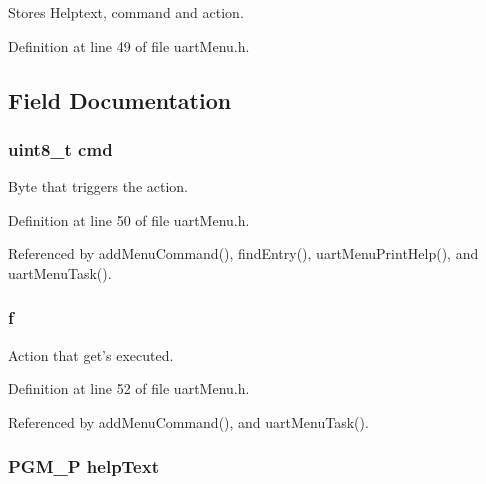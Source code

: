 Stores Helptext, command and action. 

Definition at line 49 of file uart\-Menu.\-h.



\subsection{Field Documentation}
\hypertarget{struct_menu_entry_a4d43e8212bdc9dbee866506f04effcea}{
\subsubsection[{cmd}]{\setlength{\rightskip}{0pt plus 5cm}uint8\-\_\-t cmd}}\label{struct_menu_entry_a4d43e8212bdc9dbee866506f04effcea}


Byte that triggers the action. 



Definition at line 50 of file uart\-Menu.\-h.



Referenced by add\-Menu\-Command(), find\-Entry(), uart\-Menu\-Print\-Help(), and uart\-Menu\-Task().

\hypertarget{struct_menu_entry_afe96196d3564b9577477236d13329241}{
\subsubsection[{f}]{ f}}\label{struct_menu_entry_afe96196d3564b9577477236d13329241}


Action that get's executed. 



Definition at line 52 of file uart\-Menu.\-h.



Referenced by add\-Menu\-Command(), and uart\-Menu\-Task().

\hypertarget{struct_menu_entry_a2044142917d83a3df85815bb99dd115f}{
\subsubsection[{help\-Text}]{\setlength{\rightskip}{0pt plus 5cm}P\-G\-M\-\_\-\-P help\-Text}}\label{struct_menu_entry_a2044142917d83a3df85815bb99dd115f}


